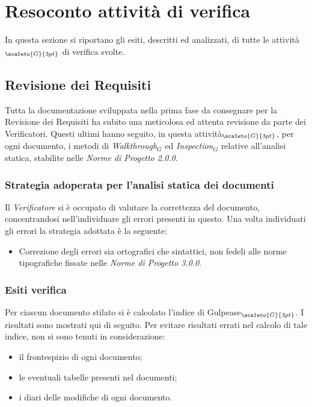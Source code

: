 \chapter{Resoconto attività di verifica } \label{ResocontoAttivitàDiVerifica}
In questa sezione si riportano gli esiti, descritti ed analizzati, di tutte le attività$_{\scaleto{G}{3pt}}$ di verifica svolte.
\section{Revisione dei Requisiti}  \label{ResocontoAttivitàDiVerificaRevisioneDeiRequisiti}
Tutta la documentazione sviluppata nella prima fase da consegnare per la Revisione dei Requisiti ha subito una meticolosa ed attenta revisione da parte dei Verificatori. Questi ultimi hanno seguito, in questa attività$_{\scaleto{G}{3pt}}$, per ogni documento, i metodi di \textit{Walkthrough$_G$} ed \textit{Inspection$_G$} relative all’analisi statica, stabilite nelle \textit{Norme di Progetto 2.0.0}. %
\subsection{Strategia adoperata per l’analisi statica dei documenti} \label{ResocontoAttivitàDiVerificaRevisioneDeiRequisitiStrategiaPerAnalisiStatica}
Il \textit{Verificatore} si è occupato di valutare la correttezza del documento, concentrandosi nell’individuare gli errori presenti in questo. Una volta individuati gli errori la strategia adottata è la seguente:
\begin{itemize}
	\item Correzione degli errori sia ortografici che sintattici, non fedeli alle norme tipografiche fissate nelle \textit{Norme di Progetto 3.0.0}.
\end{itemize}

\subsection{Esiti verifica} \label{ResocontoAttivitàDiVerificaRevisioneDeiRequisitiEsitiVerifica}
Per ciascun documento stilato si è calcolato l’indice di Gulpease$_{\scaleto{G}{3pt}}$. I risultati sono mostrati qui di seguito.
Per evitare risultati errati nel calcolo di tale indice, non si sono tenuti in considerazione:
\begin{itemize}
	\item il frontespizio di ogni documento;
	\item le eventuali tabelle presenti nel documenti;
	\item i diari delle modifiche di ogni documento.
\end{itemize}

